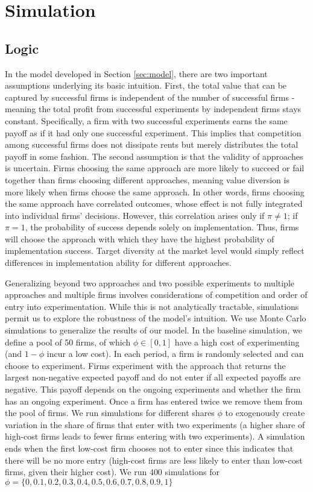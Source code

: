 \section{Simulation}\label{app:simulations}

\subsection{Logic}

In the model developed in Section \ref{sec:model}, there are two important assumptions underlying its basic intuition. First, the total value that can be captured by successful firms is independent of the number of successful firms - meaning the total profit from successful experiments by independent firms stays constant. Specifically, a firm with two successful experiments earns the same payoff as if it had only one successful experiment. This implies that competition among successful firms does not dissipate rents but merely distributes the total payoff in some fashion. The second assumption is that the validity of approaches is uncertain. Firms choosing the same approach are more likely to succeed or fail together than firms choosing different approaches, meaning value diversion is more likely when firms choose the same approach. In other words, firms choosing the same approach have correlated outcomes, whose effect is not fully integrated into individual firms' decisions. However, this correlation arises only if $\pi \neq 1$; if $\pi = 1$, the probability of success depends solely on implementation. Thus, firms will choose the approach with which they have the highest probability of implementation success. Target diversity at the market level would simply reflect differences in implementation ability for different approaches.

Generalizing beyond two approaches and two possible experiments to multiple approaches and multiple firms involves considerations of competition and order of entry into experimentation. While this is not analytically tractable, simulations permit us to explore the robustness of the model's intuition. We use Monte Carlo simulations to generalize the results of our model. In the baseline simulation, we define a pool of 50 firms, of which $\phi \in[0,1]$ have a high cost of experimenting (and $1-\phi$ incur a low cost). In each period, a firm is randomly selected and can choose to experiment. Firms experiment with the approach that returns the largest non-negative expected payoff and do not enter if all expected payoffs are negative. This payoff depends on the ongoing experiments and whether the firm has an ongoing experiment. Once a firm has entered twice we remove them from the pool of firms. We run simulations for different shares $\phi$ to exogenously create variation in the share of firms that enter with two experiments (a higher share of high-cost firms leads to fewer firms entering with two experiments). A simulation ends when the first low-cost firm chooses not to enter since this indicates that there will be no more entry (high-cost firms are less likely to enter than low-cost firms, given their higher cost). We run 400 simulations for $\phi = \{0, 0.1, 0.2, 0.3, 0.4, 0.5, 0.6, 0.7, 0.8, 0.9, 1\}$

